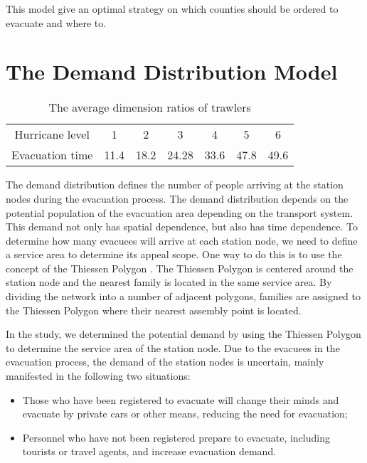 \documentclass{mcmthesis}
\begin{document}
This model give an optimal strategy on which counties should be ordered to evacuate and where to.



\section{The Demand Distribution Model}

\begin{table}[!htb]
\centering
\setlength{\abovecaptionskip}{0pt}%
\setlength{\belowcaptionskip}{10pt}%
\caption{The average dimension ratios of  trawlers}
\begin{tabular}{ccccccc}
\toprule[1.5pt]
Hurricane level &1&2&3&4&5&6\\
Evacuation time &11.4&18.2&24.28&33.6&47.8&49.6\\
\bottomrule[1.5pt]
\end{tabular}
\end{table}

The demand distribution defines the number of people arriving at the station nodes during the evacuation process. The demand distribution depends on the potential population of the evacuation area depending on the transport system. This demand not only has spatial dependence, but also has time dependence. To determine how many evacuees will arrive at each station node, we need to define a service area to determine its appeal scope. One way to do this is to use the concept of the Thiessen Polygon \cite{Bretschneider2011A}. The Thiessen Polygon is centered around the station node and the nearest family is located in the same service area. By dividing the network into a number of adjacent polygons, families are assigned to the Thiessen Polygon where their nearest assembly point is located.

In the study, we determined the potential demand by using the Thiessen Polygon to determine the service area of the station node. Due to the evacuees in the evacuation process, the demand of the station nodes is uncertain, mainly manifested in the following two situations:

\begin{itemize}

\item Those who have been registered to evacuate will change their minds and evacuate by private cars or other means, reducing the need for evacuation;
\item Personnel who have not been registered prepare to evacuate, including tourists or travel agents, and increase evacuation demand.

\end{itemize}
\end{document}
